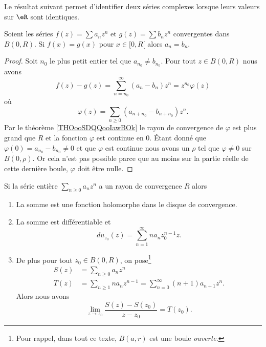 Le résultat suivant permet d'identifier deux séries complexes lorsque leurs valeurs sur \( \eR\) sont identiques.
\begin{proposition}
    Soient les séries \( f(z)=\sum a_nz^n\) et \( g(z)=\sum b_n z^n\) convergentes dans \( B(0,R)\). Si \( f(x)=g(x)\) pour \( x\in \mathopen[ 0 , R [\) alors \( a_n=b_n\).
\end{proposition}

\begin{proof}
    Soit \( n_0\) le plus petit entier tel que \( a_{n_0}\neq b_{n_0}\). Pour tout \( z\in B(0,R)\) nous avons
    \begin{equation}
        f(z)-g(z)=\sum_{n=n_0}^{\infty}(a_n-b_n)z^n=z^{n_0}\varphi(z)
    \end{equation}
    où
    \begin{equation}
        \varphi(z)=\sum_{n\geq 0}(a_{n+n_0}-b_{n+n_0})z^n.
    \end{equation}
    Par le théorème \ref{THOooSDQQooIawBOk} le rayon de convergence de \( \varphi\) est plus grand que \( R\) et la fonction \( \varphi\) est continue en \( 0\). Étant donné que \( \varphi(0)=a_{n_0}-b_{n_0}\neq 0\) et que \( \varphi\) est continue nous avons un \( \rho\) tel que \( \varphi\neq 0\) sur \( B(0,\rho)\). Or cela n'est pas possible parce que au moins sur la partie réelle de cette dernière boule, \( \varphi\) doit être nulle.
\end{proof}

\begin{proposition}     \label{PropSNMEooVgNqBP}
    Si la série entière \( \sum_{n\geq 0}a_nz^n\) a un rayon de convergence \( R\) alors
    \begin{enumerate}
        \item
            La somme est une fonction holomorphe dans le disque de convergence.
        \item       \label{ItemUULDooEGRNiA}
            La somme est différentiable et
            \begin{equation}
                du_{z_0}(z)=\sum_{n=1}^{\infty}na_nz_0^{n-1}z.
            \end{equation}
        \item
    De plus pour tout \( z_0\in B(0,R)\), on pose\footnote{Pour rappel, dans tout ce texte, \( B(a,r)\) est une boule \emph{ouverte}.}
    \begin{subequations}
        \begin{align}
            S(z)&=\sum_{n\geq 0}a_nz^n\\
            T(z)&=\sum_{n\geq 1}na_nz^{n-1}=\sum_{n=0}^{\infty}(n+1)a_{n+1}z^n.
        \end{align}
    \end{subequations}
    Alors  nous avons
    \begin{equation}    \label{EqVQDPooOPICwN}
        \lim_{z\to z_0}\frac{ S(z)-S(z_0) }{ z-z_0 }=T(z_0).
    \end{equation}
    \end{enumerate}
\end{proposition}

